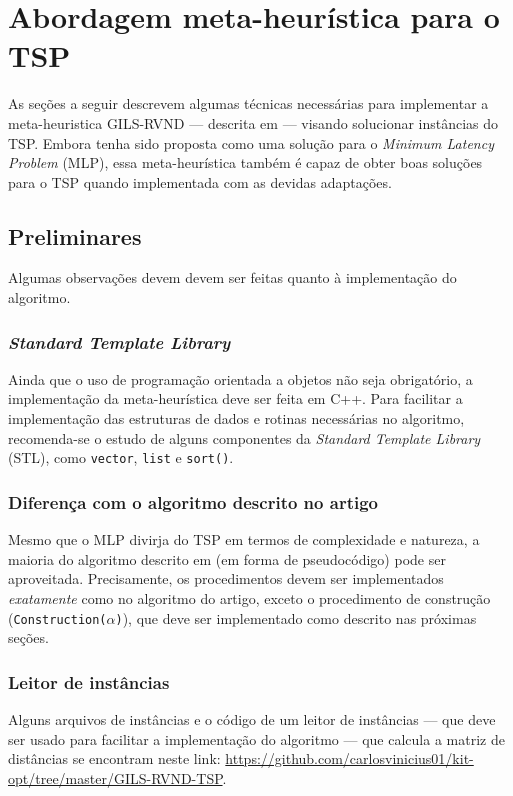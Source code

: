 \chapter{Abordagem meta-heurística para o TSP}

As seções a seguir descrevem algumas técnicas necessárias para implementar a meta-heuristica GILS-RVND --- descrita em \cite{SILVA2012513} --- visando solucionar instâncias do TSP. Embora tenha sido  proposta como uma solução para o \textit{Minimum Latency Problem} (MLP), essa meta-heurística também é capaz de obter boas soluções para o TSP quando implementada com as devidas adaptações.

\section{Preliminares}
Algumas observações devem devem ser feitas quanto à implementação do algoritmo.

\subsection{\textit{Standard Template Library}}
Ainda que o uso de programação orientada a objetos não seja obrigatório, a implementação da meta-heurística deve ser feita em C++. Para facilitar a implementação das estruturas de dados e rotinas necessárias no algoritmo, recomenda-se o estudo de alguns componentes da \textit{Standard Template Library} (STL), como \texttt{vector}, \texttt{list} e \texttt{sort()}.


\subsection{Diferença com o algoritmo descrito no artigo}
Mesmo que o MLP divirja do TSP em termos de complexidade e natureza, a maioria do algoritmo descrito em \cite{SILVA2012513} (em forma de pseudocódigo) pode ser aproveitada. Precisamente, os procedimentos devem ser implementados \textit{exatamente} como no algoritmo do artigo, exceto o procedimento de construção (\texttt{Construction(\(\alpha\))}), que deve ser implementado como descrito nas próximas seções.

\subsection{Leitor de instâncias}
Alguns arquivos de instâncias e o código de um leitor de instâncias --- que deve ser usado para facilitar a implementação do algoritmo ---  que calcula a matriz de distâncias se encontram neste link: \url{https://github.com/carlosvinicius01/kit-opt/tree/master/GILS-RVND-TSP}.

